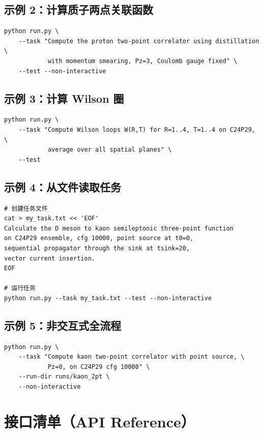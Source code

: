 \documentclass[12pt,a4paper]{ctexart}
\begin{document}
\subsection{示例 2：计算质子两点关联函数}

\begin{lstlisting}[style=bashcode]
python run.py \
    --task "Compute the proton two-point correlator using distillation \
            with momentum smearing, Pz=3, Coulomb gauge fixed" \
    --test --non-interactive
\end{lstlisting}

\subsection{示例 3：计算 Wilson 圈}

\begin{lstlisting}[style=bashcode]
python run.py \
    --task "Compute Wilson loops W(R,T) for R=1..4, T=1..4 on C24P29, \
            average over all spatial planes" \
    --test
\end{lstlisting}

\subsection{示例 4：从文件读取任务}

\begin{lstlisting}[style=bashcode]
# 创建任务文件
cat > my_task.txt << 'EOF'
Calculate the D meson to kaon semileptonic three-point function
on C24P29 ensemble, cfg 10000, point source at t0=0,
sequential propagator through the sink at tsink=20,
vector current insertion.
EOF

# 运行任务
python run.py --task my_task.txt --test --non-interactive
\end{lstlisting}

\subsection{示例 5：非交互式全流程}

\begin{lstlisting}[style=bashcode]
python run.py \
    --task "Compute kaon two-point correlator with point source, \
            Pz=0, on C24P29 cfg 10000" \
    --run-dir runs/kaon_2pt \
    --non-interactive
\end{lstlisting}

\section{接口清单（API Reference）}
\end{document}
